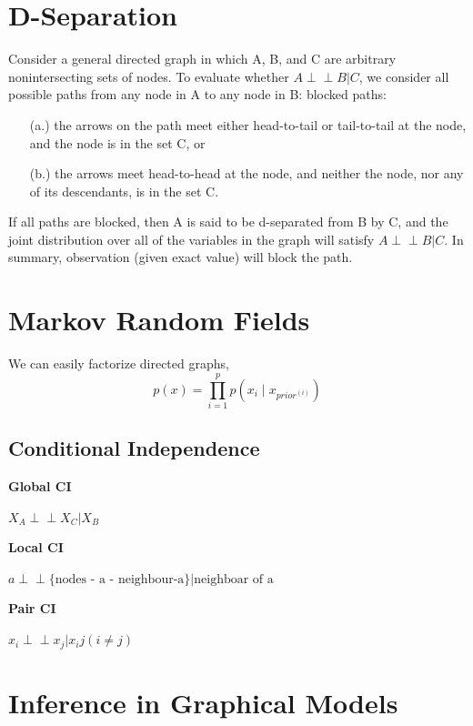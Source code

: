 \documentclass{article}
\def\ci{\perp\!\!\!\perp}
\begin{document}
\section{D-Separation}
Consider a general directed graph in which A, B, and C are arbitrary nonintersecting sets of nodes. To evaluate whether $A \ci B | C$, we consider all possible paths from any node in A to any node in B:
blocked paths:
\begin{itemize}
    \item[(a.)] the arrows on the path meet either head-to-tail or tail-to-tail at the node, and the node is in the set C, or
    \item[(b.)]the arrows meet head-to-head at the node, and neither the node, nor any of its descendants, is in the set C.
\end{itemize}
If all paths are blocked, then A is said to be d-separated from B by C, and the joint distribution over all of the variables in the graph will satisfy $A \ci B | C$.
In summary, observation (given exact value) will block the path.

\section{Markov Random Fields}
We can easily factorize directed graphs,
\begin{equation}
    p(x)=\prod_{i=1}^{p} p\left(x_{i} \mid x_{prior^{(i)}}\right)
\end{equation}
\subsection{Conditional Independence}
\textbf{Global CI}

$X_A \ci X_C | X_B$

\textbf{Local CI}

$a \ci \text{\{nodes - a - neighbour-a\}} | \text{neighboar of a} $

\textbf{Pair CI}

$x_i \ci x_j | x_ij (i \neq j)$




\section{Inference in Graphical Models}




\appendix
\end{document}
